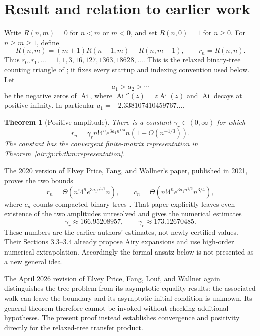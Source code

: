 \documentclass[11pt,letterpaper]{article}
\numberwithin{equation}{section}
\newtheorem{theorem}{Theorem}[section]
\theoremstyle{remark}
\newcommand{\Ai}{\operatorname{Ai}}
\begin{document}
\section{Result and relation to earlier work}\label{air:jp:rb:sec:result}

Write $R(n,m)=0$ for $n<m$ or $m<0$, and set $R(n,0)=1$ for $n\ge0$. For $n\ge m\ge1$, define
\begin{equation}\label{air:jp:rb:eq:triangle}
 R(n,m)=(m+1)R(n-1,m)+R(n,m-1),\qquad r_n=R(n,n).
\end{equation}
Thus $r_0,r_1,\ldots=1,1,3,16,127,1363,18628,\ldots$.
This is the relaxed binary-tree counting triangle of \cite{epfw}; it fixes every startup and indexing convention used below. Let
\[
 a_1>a_2>\cdots
\]
be the negative zeros of $\Ai$, where $\Ai''(z)=z\Ai(z)$ and $\Ai$ decays at positive infinity. In particular $a_1=-2.338107410459767\ldots$.

\begin{theorem}[Positive amplitude]\label{air:jp:rb:thm:main}
There is a constant $\gamma_r\in(0,\infty)$ for which
\begin{equation}\label{air:jp:rb:eq:main}
 r_n=\gamma_r n!4^n e^{3a_1n^{1/3}}n\left(1+O(n^{-1/3})\right).
\end{equation}
The constant has the convergent finite-matrix representation in Theorem~\ref{air:jp:rb:thm:representation}.
\end{theorem}

The 2020 version of Elvey Price, Fang, and Wallner's paper, published in 2021, proves the two bounds
\begin{equation}\label{air:jp:rb:eq:theta}
 r_n=\Theta\!\left(n!4^ne^{3a_1n^{1/3}}n\right),\qquad
 c_n=\Theta\!\left(n!4^ne^{3a_1n^{1/3}}n^{3/4}\right),
\end{equation}
where $c_n$ counts compacted binary trees \cite[Theorem 1.1]{epfw}.
That paper explicitly leaves even existence of the two amplitudes unresolved and gives the numerical estimates
\[
 \gamma_r\approx166.95208957,\qquad \gamma_c\approx173.12670485.
\]
These numbers are the earlier authors' estimates, not newly certified values. Their Sections 3.3--3.4 already propose Airy expansions and use high-order numerical extrapolation. Accordingly the formal ansatz below is not presented as a new general idea.

The April 2026 revision of Elvey Price, Fang, Louf, and Wallner \cite[Section 10.1]{epflw} again distinguishes the tree problem from its asymptotic-equality results: the associated walk can leave the boundary and its asymptotic initial condition is unknown. Its general theorem therefore cannot be invoked without checking additional hypotheses. The present proof instead establishes convergence and positivity directly for the relaxed-tree transfer product.
\end{document}
